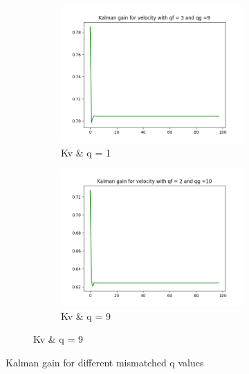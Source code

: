 \documentclass{article}
\begin{document}
\begin{figure}[H]
\begin{subfigure} {1\textwidth}
\begin{subfigure}{.3\textwidth}
                    \includegraphics[width=1\linewidth]{./img/k22_q3.png}
                    \caption{Kv \& q = 1 }
                \end{subfigure}
                \begin{subfigure}{.3\textwidth}
                    \includegraphics[width=1\linewidth]{./img/k22_qf2.png}
                    \caption{Kv \& q = 9 }
                \end{subfigure}
            \end{subfigure} 
            \caption{Kalman gain for different mismatched q values}
            \label{fig:kalmanmis}
        \end{figure}
        
\end{document}
